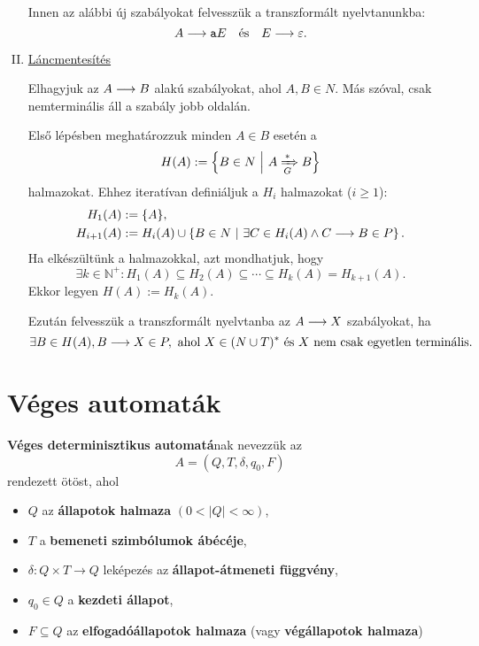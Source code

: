 \begin{mdframed}
\begin{enumerate}[I.]
	Innen az alábbi új szabályokat felvesszük a transzformált nyelvtanunkba:
	\[ A \longrightarrow \texttt{a}E \text{ ~ és ~ } E \longrightarrow \varepsilon. \]
	
	\item \underline{Láncmentesítés}
	
	Elhagyjuk az $A \longrightarrow B$ alakú szabályokat, ahol $A,B \in N$. Más szóval, csak nemterminális áll a szabály jobb oldalán.
	
	Első lépésben meghatározzuk minden $A \in B$ esetén a 
	\[ H(A) := \left\{ B \in N ~ \middle\vert ~ A \xRightarrow[{G}]{*} B \right\} \] halmazokat. Ehhez iteratívan definiáljuk a $H_i$ halmazokat ($i \geq 1$):
	\begin{align*}
		H_1(A) & := \{A\}, \\
		H_{i+1}(A) & := H_i (A) \cup \left\{ B \in N ~ \middle\vert ~ \exists C \in H_i(A) \land C \longrightarrow B \in P \right\}.
	\end{align*}
	Ha elkészültünk a halmazokkal, azt mondhatjuk, hogy
	\[ \exists k \in \mathbb{N}^+: H_1(A) \subseteq H_2(A) \subseteq \cdots \subseteq H_k(A) = H_{k+1}(A). \] Ekkor legyen $H(A) := H_k(A)$.
	
	Ezután felvesszük a transzformált nyelvtanba az $A \longrightarrow X$ szabályokat, ha
	\[ \exists B \in H(A), B \longrightarrow X \in P, \text{ ahol } X \in (N \cup T)^* \text{ és } X \text{ nem csak egyetlen terminális}. \]
\end{enumerate}

\end{mdframed}

\section{Véges automaták}


\begin{tcolorbox}
	\begin{definition}
		\textbf{Véges determinisztikus automatá}nak nevezzük az \[ A = (Q, T, \delta, q_0, F) \] rendezett ötöst, ahol
		\begin{itemize}
			\item $Q$ az \textbf{állapotok halmaza} $(0 < |Q| < \infty)$,
			\item $T$ a \textbf{bemeneti szimbólumok ábécéje},
			\item $\delta : Q \times T \to Q$ leképezés az \textbf{állapot-átmeneti függvény},
			\item $q_0 \in Q$ a \textbf{kezdeti állapot},
			\item $F \subseteq Q$ az \textbf{elfogadóállapotok halmaza} (vagy \textbf{végállapotok halmaza})
		\end{itemize}
	\end{definition}
\end{tcolorbox}

